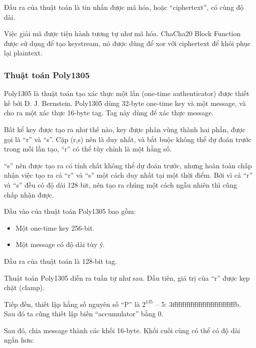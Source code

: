 Đầu ra của thuật toán là tin nhắn được mã hóa, hoặc ``ciphertext'', có cùng độ dài.

Việc giải mã được tiện hành tương tự như mã hóa. ChaCha20 Block Function được sử dụng để tạo keystream, nó được dùng để \acrshort{xor} với ciphertext để khôi phục lại plaintext.

\subsubsection{Thuật toán Poly1305}
\label{Poly1305Algorithm}

Poly1305 là thuật toán tạo xác thực một lần (one-time authenticator) được thiết kế bởi D. J. Bernstein. Poly1305 dùng 32-byte one-time key và một message, và cho ra một xác thực 16-byte tag. Tag này dùng để xác thực message.

Bất kể key được tạo ra như thế nào, key được phân vùng thành hai phần, được gọi là ``r'' và ``s''. Cặp (r,s) nên là duy nhất, và bắt buộc không thể dự đoán trước trong mỗi lần tạo, ``r'' có thể tùy chỉnh là một hằng số.

``s'' nên được tạo ra có tính chất không thể dự đoán trước, nhưng hoàn toàn chấp nhận việc tạo ra cả ``r'' và ``s'' một cách duy nhất tại một thời điểm. Bởi vì cả ``r'' và ``s'' đều có độ dài 128 bit, nên tạo ra chúng một cách ngẫu nhiên thì cũng chấp nhận được.

Đầu vào của thuật toán Poly1305 bao gồm:

\begin{itemize}
    \item Một one-time key 256-bit.
    \item Một message có độ dài tùy ý.
\end{itemize}

Đầu ra của thuật toán là 128-bit tag.

Thuật toán Poly1305 diễn ra tuần tự như sau. Đầu tiên, giá trị của ``r'' được kẹp chặt (clamp).

Tiếp đến, thiết lập hằng số nguyên số ``P'' là $2^{135}$ – 5: 3fffffffffffffffffffffffffffffffb. Sau đó ta cũng thiết lập biến ``accumulator'' bằng 0.

Sau đó, chia message thành các khối 16-byte. Khối cuối cùng có thể có độ dài ngắn hơn:

